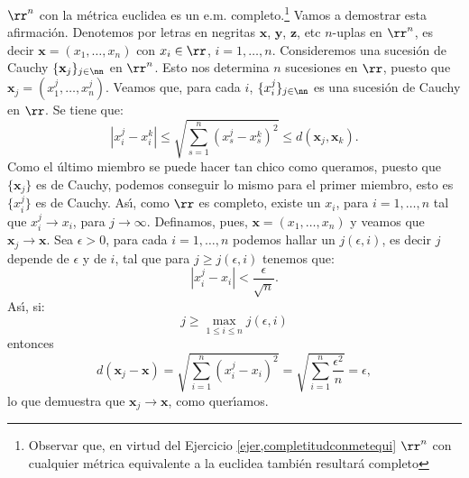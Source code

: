  \begin{ejemplo}{} $\rr^n$ con la métrica euclidea es un e.m.
 completo.\footnote{Observar que, en virtud del Ejercicio
 \vref{ejer,completitudconmetequi} $\rr^n$ con cualquier
 métrica equivalente a la euclidea también resultará
 completo} Vamos a demostrar esta afirmación. Denotemos
 por letras en negritas $\mathbf{x}$, $\mathbf{y}$, $\mathbf{z}$,
 etc $n$-uplas en $\rr^n$, es decir $\mathbf{x}=(x_1,\dots, x_n)$
 con $x_i\in\rr$, $i=1,\dots,n$. Consideremos una sucesión de
 Cauchy  $\{\mathbf{x}_j\}_{j\in\nn}$ en $\rr^n$. Esto nos determina $n$
 sucesiones en $\rr$, puesto que
 $\mathbf{x}_j=(x_1^j,\dots,x_n^j)$. Veamos que, para cada $i$,
 $\{x_i^j\}_{j\in\nn}$ es una sucesión de Cauchy en $\rr$. Se
 tiene que:
\[
    |x_i^j-x_i^k|\leq \sqrt{\sum\limits_{s=1}^n(x_s^j-x_s^k)^2}\leq
    d(\mathbf{x}_j,\mathbf{x}_k).
\]
Como el último miembro se puede hacer tan chico como queramos,
puesto que $\{\mathbf{x}_j\}$ es de Cauchy, podemos conseguir lo
mismo para el primer miembro, esto es $\{x_i^j\}$ es de Cauchy.
As\'{\i}, como $\rr$ es completo, existe un $x_i$, para
$i=1,\dots,n$ tal que $x_i^j\rightarrow x_i$, para
$j\rightarrow\infty$. Definamos, pues,
$\mathbf{x}=(x_1,\dots,x_n)$ y veamos que $\mathbf{x}_j\rightarrow
\mathbf{x}$. Sea $\epsilon>0$, para cada $i=1,\dots,n$ podemos
hallar un $j(\epsilon,i)$, es decir $j$ depende de $\epsilon $ y
de $i$, tal que para $j\geq j(\epsilon, i)$ tenemos que:
\[
    |x_i^j-x_i|<\frac{\epsilon}{\sqrt{n}}.
\]
As\'{\i}, si:
\[
    j\geq\max\limits_{1\leq i\leq n}j(\epsilon,i)
\]
entonces
\[
    d(\mathbf{x}_j-\mathbf{x})=\sqrt{\sum\limits_{i=1}^n(x_i^j-x_i)^2}=
    \sqrt{\sum\limits_{i=1}^n\frac{\epsilon^2}{n}}=\epsilon,
\]
lo que demuestra que $\mathbf{x}_j\rightarrow \mathbf{x}$, como
quer\'{\i}amos.
\end{ejemplo}

